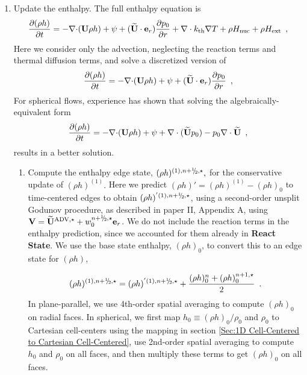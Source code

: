 \begin{description}
\begin{enumerate}
\item Update the enthalpy.  The full enthalpy equation is 
  \begin{equation}
  \frac{\partial (\rho h)}{\partial t}  = - \mathbf{\nabla} \mathbf{\cdot} ({\bf U} \rho h)
+ \psi + (\widetilde{{\bf U}} \cdot \mathbf{e}_r) \frac{\partial p_0}{\partial r} + \nabla\cdot k_{\rm th}\nabla T + \rho {H_{\rm nuc}} + \rho {H_{\rm ext}} 
\enskip , \label{eq:rhohupd} 
  \end{equation}
Here we consider only the advection, neglecting the reaction terms and thermal diffusion terms,
and solve a discretized version of
  \begin{equation}
  \frac{\partial (\rho h)}{\partial t}  = - \mathbf{\nabla} \mathbf{\cdot} ({\bf U} \rho h)
+ \psi + (\widetilde{{\bf U}} \cdot \mathbf{e}_r) \frac{\partial p_0}{\partial r} 
\enskip , \label{eq:rhohupdadv} 
  \end{equation}
For spherical flows, experience has shown that solving the algebraically-equivalent form
\begin{equation}
  \frac{\partial (\rho h)}{\partial t}  = - \mathbf{\nabla} \mathbf{\cdot} ({\bf U} \rho h)
+ \psi + \nabla \cdot (\widetilde{{\bf U}} p_0) - p_0 \nabla \cdot \widetilde{{\bf U}}  
\enskip , \label{eq:rhohupdadv2} 
\end{equation}
results in a better solution.


  \begin{enumerate}
  \renewcommand{\labelenumii}{{\bf \roman{enumii}}.}

  \item Compute the enthalpy edge state, $(\rho h)^{(1),\nph,\star},$
    for the conservative update of $(\rho h)^{(1)}.$  Here we predict 
    $(\rho h)' = (\rho h)^{(1)} - (\rho h)_0$ to time-centered edges to obtain 
    $(\rho h)^{'(1),\nph,\star}$, 
    using a second-order unsplit Godunov procedure, 
    as described in paper II, Appendix A, using $\Vb =
    \uadvone+w_0^{\nph,\star} \er$.  We do not include the reaction
    terms in the enthalpy prediction, since we accounted for them
    already in {\bf React State}.  We use the base state enthalpy,
    $(\rho h)_0$, to convert this to an edge state for $(\rho h)$,

    
\begin{equation}
(\rho h)^{(1),\nph,\star} = 
(\rho h)^{'(1),\nph,\star} + \frac{(\rho h)_0^n + (\rho h)_0^{n+1,\star}}{2}
\enskip .
\end{equation}
  In plane-parallel, we use 4th-order spatial averaging to compute $(\rho h)_0$
  on radial faces.  In spherical, we first map $h_0 \equiv (\rho h)_0/\rho_0$ 
  and $\rho_0$ to Cartesian cell-centers using the mapping in section 
  \ref{Sec:1D Cell-Centered to Cartesian Cell-Centered}, use 2nd-order spatial 
  averaging to compute $h_0$ and $\rho_0$ on all faces, and then multiply these 
  terms to get $(\rho h)_0$ on all faces.


\end{enumerate}
\end{enumerate}
\end{description}

